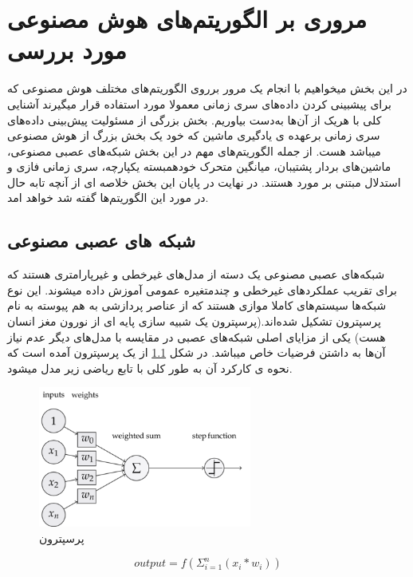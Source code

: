 \chapter{مروری بر الگوریتم‌های هوش مصنوعی مورد بررسی}

در این بخش میخواهیم با انجام یک مرور برروی الگوریتم‌های مختلف هوش مصنوعی که برای پیشبینی کردن داده‌های سری زمانی
معمولا مورد استفاده قرار میگیرند آشنایی کلی با هریک از آن‌ها به‌دست بیاوریم.
بخش بزرگی از مسئولیت پیش‌بینی داده‌های سری زمانی برعهده ی یادگیری ماشین که خود یک بخش بزرگ از هوش مصنوعی میباشد هست.
از جمله الگوریتم‌های مهم در این بخش شبکه‌های عصبی مصنوعی، ماشین‌های بردار پشتیبان، میانگین متحرک خودهمبسته یکپارچه، سری زمانی فازی و استدلال مبتنی بر مورد هستند. 
در نهایت در پایان این بخش خلاصه ای از آنچه تابه حال در مورد این الگوریتم‌ها گفته شد خواهد امد.

\section{شبکه های عصبی مصنوعی}

شبکه‌های عصبی مصنوعی یک دسته از مدل‌های غیر‌خطی و غیر‌پارامتری هستند که برای تقریب عملکرد‌های غیر‌خطی و چند‌متغیره عمومی آموزش داده میشوند. 
این نوع شبکه‌ها سیستم‌های کاملا موازی هستند که از عناصر پردازشی به هم پیوسته به نام پرسپترون تشکیل شده‌اند.(پرسپترون یک شبیه سازی پایه ای از نورون مغز انسان هست)
یکی از مزایای اصلی شبکه‌های عصبی در مقایسه با مدل‌های دیگر عدم نیاز آن‌ها به داشتن فرضیات خاص میباشد.
در شکل \ref{fig:perceptron} از یک پرسپترون آمده است که نحوه ی کارکرد آن به طور کلی با تابع ریاضی زیر مدل میشود.

\begin{figure}[ht!]
    \begin{center}
        \includegraphics[width=7cm]{images/perceptron.png}
    \end{center}
    \caption[پرسپترون]{پرسپترون}
    \label{fig:perceptron}
    \end{figure}

\begin{equation}\label{eq:perceptron}
    output = f(\Sigma_{i = 1}^{n}(x_i*w_i))
\end{equation}

